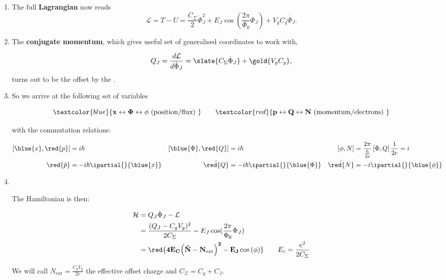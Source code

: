 \begin{enumerate}
\item The full \textbf{Lagrangian} now reads
  \begin{equation}
    \mathcal{L} = T - U = \frac{C_\Sigma}{2}\dot{\Phi}_J^2 + E_J\cos\left( \frac{2\pi}{\Phi_0}\Phi_J \right) + V_gC_g\dot{\Phi_J}.
  \end{equation}

\item  The \textbf{conjugate  momentum},  which gives  useful set  of
  generalised coordinates to work with,

  \begin{equation}
    Q_J = \frac{d\mathcal{L}}{d\dot{\Phi}_J} = \slate{C_\Sigma\dot{\Phi}_J} + \gold{V_gC_g},
  \end{equation}
  \noindent turns out to be  the    offset   by   the
  .

\item So we arrive at the following set of variables

  \begin{equation}
    { \textcolor{blue}{\mathbf{x\leftrightarrow \Phi \leftrightarrow \phi} \text{ (position/flux) }}\qquad \textcolor{red}{\mathbf{p\leftrightarrow Q \leftrightarrow N \text{ (momentum/electrons) }}}}
  \end{equation}

  \noindent with the commutation relations:

  \begin{align}
    \left[\blue{x},\red{p}\right] & =i\hbar & \left[\blue{\Phi},\red{Q}\right] & = i\hbar & \left[\phi,N\right] & = \frac{2\pi}{\frac{h}{2e}}\left[\Phi,Q\right]\frac{1}{2e} = i\\
    \red{\hat{p}} & = -i\hbar\ipartial{}{\blue{x}} & \hat{\red{Q}} & =-i\hbar\ipartial{}{\blue{\Phi}} & \hat{\red{N}} & =-i\ipartial{}{\blue{\phi}}
  \end{align}

\item\

\begin{framed}\noindent
  The Hamiltonian is then:

  \begin{equation}\label{eqn:cpbox_final}
    \begin{aligned}
      \mathcal{H} & = Q_J\dot{\Phi}_J - \mathcal{L}\\
      & = \frac{(Q_J - C_gV_g)^2}{2C_\Sigma} - E_J\cos(\frac{2\pi}{\Phi_0}\Phi_J)\\
      &   =   \mathbf{\red{4E_C{\left(\hat{N}-N_\text{ext}\right)^2}-
          E_J\cos\left(\phi\right)}}\qquad E_c = \frac{e^2}{2C_\Sigma}
    \end{aligned}
  \end{equation}

  \noindent We  will call $  N_\text{ext} = \frac{C_g V_g}{2e}  $ the
  effective offset charge and $C_{\Sigma} = C_g+C_J$.
\end{framed}
\end{enumerate}

